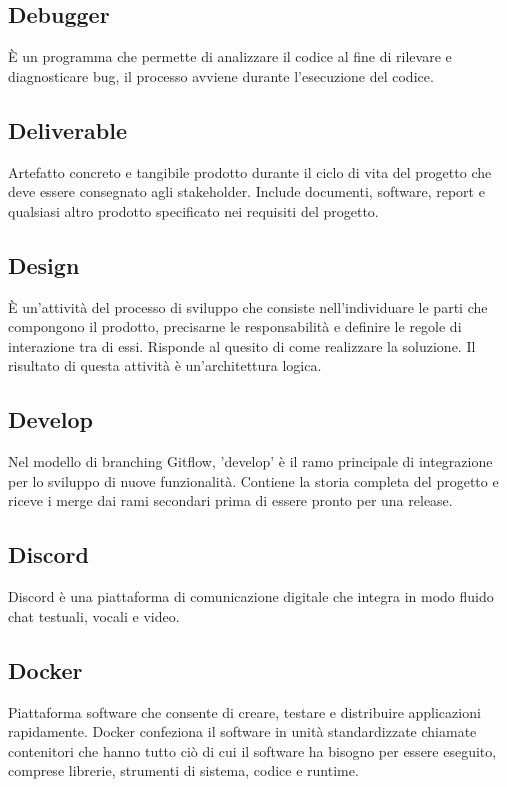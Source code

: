 \documentclass[10pt, letterpaper]{article}
\begin{document}
\subsection*{Debugger}
È un programma che permette di analizzare il codice al fine di rilevare e diagnosticare bug, il processo avviene durante l'esecuzione del codice.

\subsection*{Deliverable}
Artefatto concreto e tangibile prodotto durante il ciclo di vita del progetto che deve essere consegnato agli stakeholder. Include documenti, software, report e
qualsiasi altro prodotto specificato nei requisiti del progetto.

\subsection*{Design}
È un'attività del processo di sviluppo che consiste nell'individuare le parti che compongono il prodotto, precisarne le responsabilità e definire le regole di interazione tra di essi. Risponde al quesito di come realizzare la soluzione. Il risultato di questa attività è un'architettura logica.

\subsection*{Develop}
Nel modello di branching Gitflow, 'develop' è il ramo principale di integrazione per lo sviluppo di nuove funzionalità. Contiene la storia completa del progetto
e riceve i merge dai rami secondari prima di essere pronto per una release.

\subsection*{Discord}
Discord è una piattaforma di comunicazione digitale che integra in modo fluido chat testuali, vocali e video.

\subsection*{Docker}
Piattaforma software che consente di creare, testare e distribuire applicazioni rapidamente. Docker confeziona il software in unità standardizzate chiamate contenitori
che hanno tutto ciò di cui il software ha bisogno per essere eseguito, comprese librerie, strumenti di sistema, codice e runtime.
\end{document}
